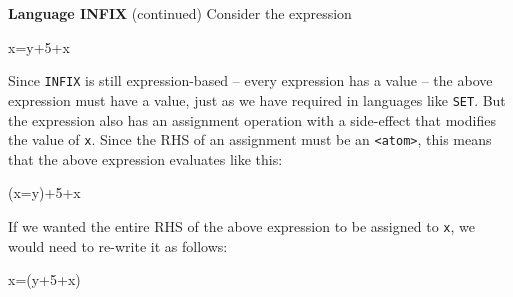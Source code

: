 \begin{minipage}[t]{\sw}
\slidenumber
\LARGE
{\bf Language INFIX} (continued)\exx
Consider the expression
{\Large
\begin{qv}
x=y+5+x
\end{qv}
}
Since \verb'INFIX' is still expression-based --
every expression has a value --
the above expression must have a value,
just as we have required in languages like \verb'SET'.
But the expression also has an assignment operation
with a side-effect that modifies the value of \verb'x'.
Since the RHS of an assignment must be an \verb'<atom>',
this means that the above expression evaluates like this:
{\Large
\begin{qv}
(x=y)+5+x %
\end{qv}
}
If we wanted the entire RHS of the above expression
to be assigned to \verb'x', we would need to re-write it as follows:
{\Large
\begin{qv}
x=(y+5+x)
\end{qv}
}
\end{minipage}
